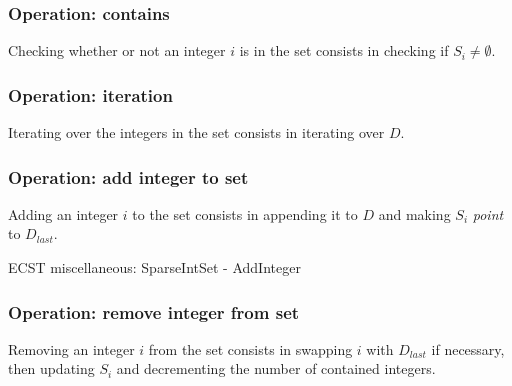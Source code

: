 \documentclass[oneside, 12pt, a4paper, openany]{book}
\begin{document}
\subsubsection{Operation: contains}\label{operation-contains}

Checking whether or not an integer \(i\) is in the set consists in
checking if \(S_i \neq \emptyset\).

\subsubsection{Operation: iteration}\label{operation-iteration}

Iterating over the integers in the set consists in iterating over \(D\).

\subsubsection{Operation: add integer to
set}\label{operation-add-integer-to-set}

Adding an integer \(i\) to the set consists in appending it to \(D\) and
making \(S_i\) \emph{point} to \(D_{last}\).

\begin{algorithm}[H]

\caption{ECST miscellaneous: SparseIntSet - AddInteger}
\footnotesize



\end{algorithm}

\subsubsection{Operation: remove integer from
set}\label{operation-remove-integer-from-set}

Removing an integer \(i\) from the set consists in swapping \(i\) with
\(D_{last}\) if necessary, then updating \(S_i\) and decrementing the
number of contained integers.
\end{document}
